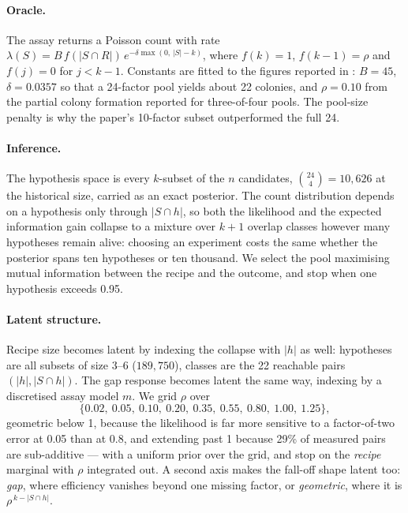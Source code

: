 \documentclass[10pt]{article}
\begin{document}
\paragraph{Oracle.} The assay returns a Poisson count with rate
$\lambda(S) = B\, f(|S \cap R|)\, e^{-\delta \max(0,\,|S|-k)}$, where $f(k)=1$,
$f(k-1)=\rho$ and $f(j)=0$ for $j<k-1$. Constants are fitted to the figures
reported in \citet{takahashi2006}: $B = 45$, $\delta = 0.0357$ so that a
24-factor pool yields about 22 colonies, and $\rho = 0.10$ from the partial
colony formation reported for three-of-four pools. The pool-size penalty is
why the paper's 10-factor subset outperformed the full 24.

\paragraph{Inference.} The hypothesis space is every $k$-subset of the $n$
candidates, $\binom{24}{4} = 10{,}626$ at the historical size, carried as an
exact posterior. The count distribution depends on a hypothesis only through
$|S \cap h|$, so both the likelihood and the expected information gain collapse
to a mixture over $k+1$ overlap classes however many hypotheses remain alive:
choosing an experiment costs the same whether the posterior spans ten
hypotheses or ten thousand. We select the pool maximising mutual information
between the recipe and the outcome, and stop when one hypothesis exceeds 0.95.

\paragraph{Latent structure.} Recipe size becomes latent by indexing the
collapse with $|h|$ as well: hypotheses are all subsets of size 3--6
($189{,}750$), classes are the 22 reachable pairs $(|h|, |S \cap h|)$. The gap
response becomes latent the same way, indexing by a discretised assay model
$m$. We grid $\rho$ over
\[
  \{0.02,\ 0.05,\ 0.10,\ 0.20,\ 0.35,\ 0.55,\ 0.80,\ 1.00,\ 1.25\},
\]
geometric below 1, because the likelihood is far more sensitive to
a factor-of-two error at 0.05 than at 0.8, and extending past 1 because 29\% of
measured pairs are sub-additive --- with a uniform prior over the grid, and
stop on the \emph{recipe} marginal with $\rho$ integrated out. A second axis
makes the fall-off shape latent too: \emph{gap}, where efficiency vanishes
beyond one missing factor, or \emph{geometric}, where it is
$\rho^{\,k-|S\cap h|}$.
\end{document}
